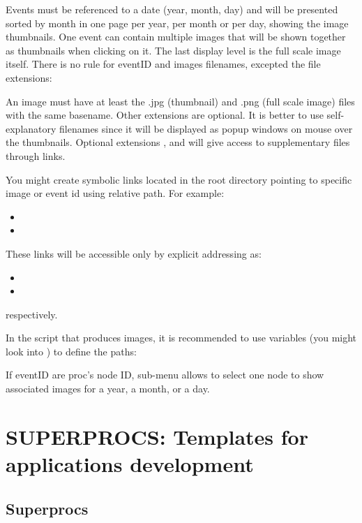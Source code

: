 Events must be referenced to a date (year, month, day) and will be presented sorted by month in one page per year, per month or per day, showing the image thumbnails. One event can contain multiple images that will be shown together as thumbnails when clicking on it. The last display level is the full scale image itself. There is no rule for eventID and images filenames, excepted the file extensions:

\hspace{15pt}

An image must have at least the .jpg (thumbnail) and .png (full scale image) files with the same basename. Other extensions are optional.
It is better to use self-explanatory filenames since it will be displayed as popup windows on mouse over the thumbnails. Optional extensions ,  and  will give access to supplementary files through links.

You might create symbolic links located in the root directory  pointing to specific image or event id using relative path. For example:
\begin{itemize}
\item {}
\item {}
\end{itemize}

These links will be accessible only by explicit addressing as:
\begin{itemize}
\item {}
\item {}
\end{itemize}
\noindent respectively.

In the script that produces images, it is recommended to use \webobs variables (you might look into ) to define the paths:

\hspace{15pt}

If eventID are proc's node ID, sub-menu allows to select one node to show associated images for a year, a month, or a day.

\section{SUPERPROCS: Templates for applications development}

\subsection{Superprocs}


\subsubsection{}
